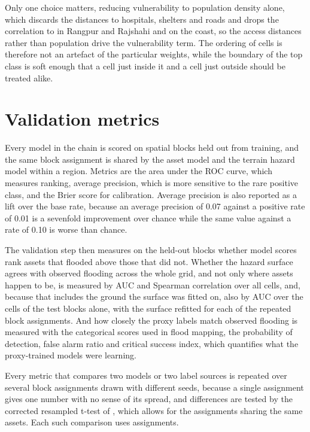 \documentclass[11pt]{article}
\begin{document}
Only one choice matters, reducing vulnerability to population density alone, which discards the distances to hospitals, shelters and roads and drops the correlation to \RRSensPopOnlyRho{} in Rangpur and Rajshahi and \CoastalSensPopOnlyRho{} on the coast, so the access distances rather than population drive the vulnerability term. The ordering of cells is therefore not an artefact of the particular weights, while the boundary of the top class is soft enough that a cell just inside it and a cell just outside should be treated alike.

\section{Validation metrics}
\label{si:metrics}

Every model in the chain is scored on spatial blocks held out from training, and the same block assignment is shared by the asset model and the terrain hazard model within a region. Metrics are the area under the ROC curve, which measures ranking, average precision, which is more sensitive to the rare positive class, and the Brier score for calibration. Average precision is also reported as a lift over the base rate, because an average precision of 0.07 against a positive rate of 0.01 is a sevenfold improvement over chance while the same value against a rate of 0.10 is worse than chance.

The validation step then measures on the held-out blocks whether model scores rank assets that flooded above those that did not. Whether the hazard surface agrees with observed flooding across the whole grid, and not only where assets happen to be, is measured by AUC and Spearman correlation over all cells, and, because that includes the ground the surface was fitted on, also by AUC over the cells of the test blocks alone, with the surface refitted for each of the repeated block assignments. And how closely the proxy labels match observed flooding is measured with the categorical scores used in flood mapping, the probability of detection, false alarm ratio and critical success index, which quantifies what the proxy-trained models were learning.

Every metric that compares two models or two label sources is repeated over several block assignments drawn with different seeds, because a single assignment gives one number with no sense of its spread, and differences are tested by the corrected resampled t-test of \citet{nadeau2003}, which allows for the assignments sharing the same assets. Each such comparison uses \RRBenchSeeds{} assignments.
\end{document}
